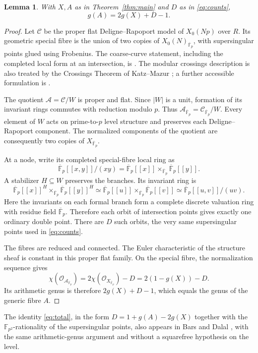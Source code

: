 \documentclass[11pt,a4paper]{article}
\newtheorem{lemma}[theorem]{Lemma}
\theoremstyle{remark}\newtheorem{remark}[theorem]{Remark}
\numberwithin{equation}{section}
\newcommand{\kk}{\overline{\mathbb F}_p}
\begin{document}
	\begin{lemma}\label{lem:total}
		With $X,A$ as in Theorem~\ref{thm:main} and $D$ as in \eqref{eq:counts},
		\begin{equation}\label{eq:total}
			g(A)=2g(X)+D-1.
		\end{equation}
	\end{lemma}
	\begin{proof}
		Let $\mathscr C$ be the proper flat Deligne--Rapoport model of $X_0(Np)$ over $R$. Its geometric special fibre is the union of two copies of $X_0(N)_{\kk}$, with supersingular points glued using Frobenius. The coarse-curve statement, including the completed local form at an intersection, is \cite[VI, Theorem 6.9(ii)--(iii), Corollary 6.10]{DR}. The modular crossings description is also treated by the Crossings Theorem of Katz--Mazur \cite[Theorem 13.1.3, p.~390]{KM}; a further accessible formulation is \cite[Theorem 2.7]{Niles}.
		
		The quotient $\mathscr A=\mathscr C/W$ is proper and flat. Since $|W|$ is a unit, formation of its invariant rings commutes with reduction modulo $p$. Thus $\mathscr A_{\kk}=\mathscr C_{\kk}/W$. Every element of $W$ acts on prime-to-$p$ level structure and preserves each Deligne--Rapoport component. The normalized components of the quotient are consequently two copies of $X_{\kk}$.
		
		At a node, write its completed special-fibre local ring as
		\[
		\kk[[x,y]]/(xy)
		=\kk[[x]]\mathbin{\times}_{\kk}\kk[[y]].
		\]
		A stabilizer $H\subseteq W$ preserves the branches. Its invariant ring is
		\[
		\kk[[x]]^H\mathbin{\times}_{\kk}\kk[[y]]^H
		\simeq\kk[[u]]\mathbin{\times}_{\kk}\kk[[v]]
		\simeq\kk[[u,v]]/(uv).
		\]
		Here the invariants on each formal branch form a complete discrete valuation ring with residue field $\kk$. Therefore each orbit of intersection points gives exactly one ordinary double point. There are $D$ such orbits, the very same supersingular points used in \eqref{eq:counts}.
		
		The fibres are reduced and connected. The Euler characteristic of the structure sheaf is constant in this proper flat family. On the special fibre, the normalization sequence gives
		\[
		\chi(\mathcal O_{\mathscr A_{\kk}})
		=2\chi(\mathcal O_{X_{\kk}})-D=2(1-g(X))-D.
		\]
		Its arithmetic genus is therefore $2g(X)+D-1$, which equals the genus of the generic fibre $A$.
	\end{proof}
	
	The identity \eqref{eq:total}, in the form $D=1+g(A)-2g(X)$ together with the $\mathbb F_{p^2}$-rationality of the supersingular points, also appears in Bars and Dalal \cite[Lemma~30]{BarsDalal}, with the same arithmetic-genus argument and without a squarefree hypothesis on the level.
	
\end{document}
